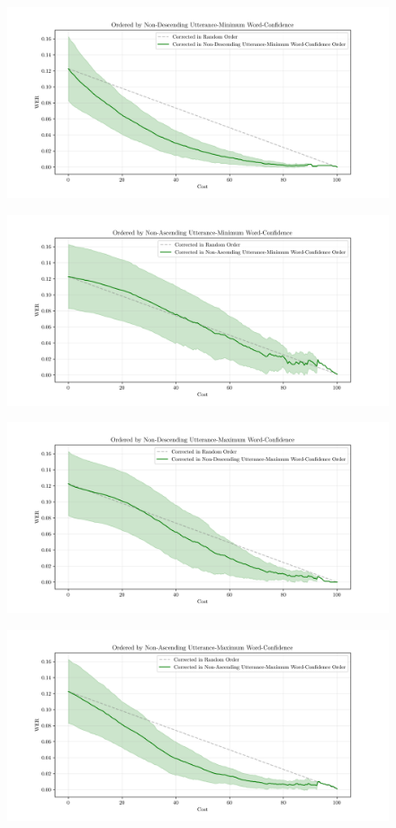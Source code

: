 \begin{figure}[h]
 \includegraphics[width=\textwidth]{figures/word-conf-comparison-plot1.png}
 \centering
\end{figure}
\begin{figure}[h]
 \includegraphics[width=\textwidth]{figures/word-conf-comparison-plot2.png}
 \centering
\end{figure}
\begin{figure}[h]
 \includegraphics[width=\textwidth]{figures/word-conf-comparison-plot3.png}
 \centering
\end{figure}
\begin{figure}[h]
 \includegraphics[width=\textwidth]{figures/word-conf-comparison-plot4.png}
 \centering
\end{figure}

